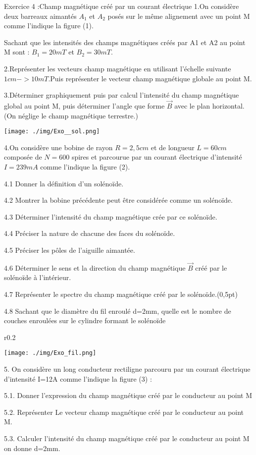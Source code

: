 \documentclass[12pt, french]{article}
\begin{document}
\begin{Box2}{Exercice 4 :Champ magnétique créé par un courant électrique  }
1.On considère deux barreaux aimantés $A_1$ et $A_2$ posés sur le même alignement avec un point M comme l'indique la
figure (1).

Sachant que les intensités des champs magnétiques créés par A1 et A2 au point M sont : $B_1=20mT$ et $B_2=30mT$.

2.Représenter les vecteurs champ magnétique en utilisant l'échelle suivante $1cm ->10mT$.Puis représenter le vecteur champ magnétique globale au point M.

3.Déterminer graphiquement puis par calcul l'intensité du champ magnétique 
   global au point M, puis déterminer l'angle que forme $\vec{B}$ avec le plan horizontal.(On néglige le champ magnétique terrestre.)
  \begin{center}
     \texttt{[image: ./img/Exo\_\_sol.png]}
  \end{center}
4.On considère une bobine de rayon $R=2,5cm$ et de longueur $L=60cm$ composée de $N=600$ spires et parcourue par un courant électrique d'intensité $I=239mA$ comme l'indique la figure (2).

4.1 Donner la définition d'un solénoïde.

   4.2 Montrer la bobine précédente peut être considérée comme un solénoïde.

   4.3 Déterminer l'intensité du champ magnétique crée par ce solénoïde.

   4.4 Préciser la nature de chacune des faces du solénoïde.

   4.5 Préciser les pôles de l'aiguille aimantée.

   4.6  Déterminer le sens et la direction du champ magnétique $\vec{B}$ créé par le solénoïde à l'intérieur.

   4.7 Représenter le spectre du champ magnétique créé par le solénoïde.(0,5pt)

   4.8 Sachant que le diamètre du fil enroulé d=2mm, quelle est le nombre de couches enroulées sur le cylindre formant le solénoïde

   \begin{wrapfigure}{r}{0.2\textwidth}
  \begin{center}
     \texttt{[image: ./img/Exo\_fil.png]}
  \end{center}
\end{wrapfigure}


   5. On considère un long conducteur rectiligne parcouru par un courant électrique d'intensité I=12A comme l'indique la
figure (3) :

5.1. Donner l'expression du champ magnétique créé par le conducteur au point M

5.2. Représenter Le vecteur champ magnétique créé par le conducteur au point M.

5.3. Calculer l'intensité du champ magnétique créé par le conducteur au point M on donne d=2mm.

\end{Box2}
\end{document}
